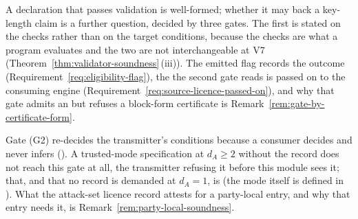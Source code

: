
A declaration that passes validation is well-formed; whether it may back a
key-length claim is a further question, decided by three gates. The first is
stated on the checks rather than on the target conditions, because the checks
are what a program evaluates and the two are not interchangeable at V7
(Theorem~\ref{thm:validator-soundness}\,(iii)). The emitted flag records the outcome
(Requirement~\ref{req:eligibility-flag}), the  the second gate
reads is passed on to the consuming engine
(Requirement~\ref{req:source-licence-passed-on}), and why that gate admits an
 but refuses a block-form certificate is
Remark~\ref{rem:gate-by-certificate-form}.

Gate (G2) re-decides the transmitter's conditions because a consumer decides
and never infers (). A
trusted-mode specification at $d_A\ge2$ without the record does not reach
this gate at all, the transmitter refusing it before this module sees it;
that, and that no record is demanded at $d_A=1$, is
 (the mode itself is defined in
). What the attack-set licence record
attests for a party-local entry, and why that entry needs it, is
Remark~\ref{rem:party-local-soundness}.

